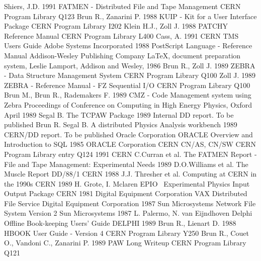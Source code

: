 \begin{thebibliography}{99}
Shiers, J.D.
1991
FATMEN - Distributed File and Tape Management 
CERN Program Library Q123
Brun R., Zanarini P.
1988
KUIP - Kit for a User Interface Package
CERN Program Library I202
Klein H.J., Zoll J.
1988
PATCHY Reference Manual
CERN Program Library L400
Cass, A.
1991
CERN TMS Users Guide
Adobe Systems Incorporated
1988
PostScript Language - Reference Manual
Addison-Wesley Publishing Company
\LaTeX, document preparation system,
Leslie Lamport, Addison and Wesley, 1986
Brun R., Zoll J.
1989
ZEBRA - Data Structure Management System
CERN Program Library Q100
Zoll J.
1989
ZEBRA - Reference Manual - FZ Sequential I/O
CERN Program Library Q100
Brun M., Brun R., Rademakers F.
1989
CMZ - Code Management system using Zebra
Proceedings of Conference on Computing in High Energy Physics, Oxford April 1989
Segal B.
The TCPAW Package
1989
Internal DD report. To be published
Brun R.
Segal B.
A distributed Physics Analysis workbench
1989
CERN/DD report. To be published
Oracle Corporation
ORACLE Overview and Introduction to SQL
1985
ORACLE Corporation
CERN
CN/AS, CN/SW
CERN Program Library entry Q124
1991
CERN
C.Curran et al.
The FATMEN Report - File and Tape Management: Experimental Needs
1989
D.O.Williams et al.
The Muscle Report DD/88/1
CERN
1988
J.J. Thresher et al.
Computing at CERN in the 1990s
CERN
1989
H. Grote, I. Mclaren
EPIO \ Experimental Physics Input Output Package
CERN
1981
Digital Equipment Corporation
VAX Distributed File Service
Digital Equipment Corporation
1987
Sun Microsystems
Network File System Version 2
Sun Microsystems
1987
L. Palermo, N. van Eijndhoven
Delphi Offline Book-keeping Users' Guide
DELPHI
1989
Brun R., Lienart D.
1988
HBOOK User Guide - Version 4
CERN Program Library Y250
Brun R., Couet O., Vandoni C., Zanarini P.
1989
PAW Long Writeup
CERN Program Library Q121
\end{thebibliography}
